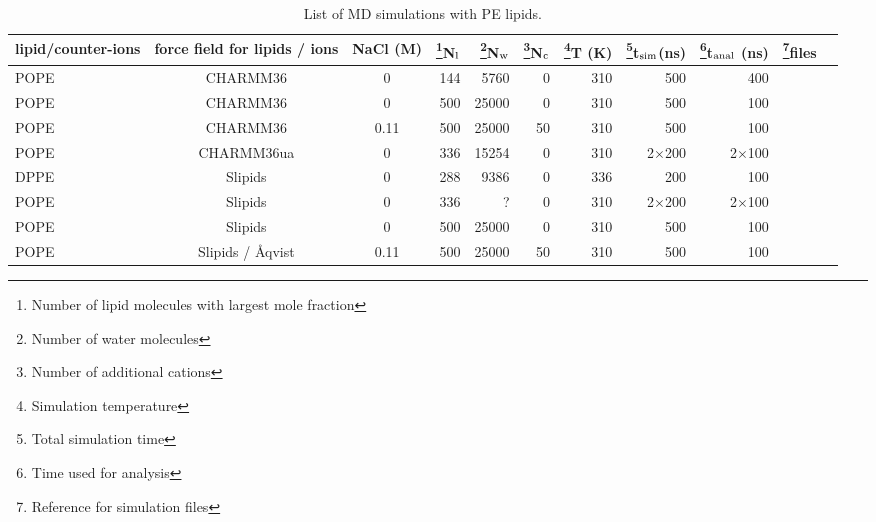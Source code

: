 \documentclass[aps,prl,superscriptaddress,twocolumn]{revtex4}
\begin{document}
\begin{table*}[htb]
  \centering
  \caption{List of MD simulations with PE lipids.
  }\label{systemsPE}
  \begin{minipage}[t]{\textwidth}
    \begin{tabular}{l c c r r r r r r c c}
      lipid/counter-ions & force field for lipids / ions  & NaCl (M) & \footnote{Number of lipid molecules with largest mole fraction}N$_{\rm l}$   &  \footnote{Number of water molecules}N$_{\rm w}$   & \footnote{Number of additional cations}N$_{\rm c}$   & \footnote{Simulation temperature}T (K)  & \footnote{Total simulation time}t$_{{\rm sim}}$(ns) & \footnote{Time used for analysis}t$_{{\rm anal}}$ (ns) &   \footnote{Reference for simulation files}files\\
      \hline
      POPE  & CHARMM36 \cite{??}           &0       & 144	& 5760  &0    & 310  & 500          & 400          & \cite{charmm36POPEfiles} \\
      POPE  & CHARMM36 \cite{??}           & 0      & 500       & 25000 & 0   &  310  & 500 & 100 & \cite{POPEcharmm} \\
      POPE  & CHARMM36 \cite{??}           & 0.11   & 500       & 25000 & 50  &  310  & 500 & 100 & \cite{POPEcharmm150mMNaCl} \\
      POPE  & CHARMM36ua \cite{??}         &0       & 336	& 15254 &0    & 310  & 2$\times$200 & 2$\times$100 & \cite{charmm36uaPOPEfiles}  \\
      \hline
      DPPE  & Slipids \cite{jambeck12b}    &0    & 288 	& 9386  &0    & 336  & 200 & 100 & \cite{slipidsDPPEfiles}  \\
      POPE  & Slipids \cite{jambeck12b} &0    & 336	& ?     &0    & 310  & 2$\times$200 &  2$\times$100 & \cite{slipidsPOPEfiles}  \\
      POPE  & Slipids \cite{jambeck12b}            & 0    & 500 & 25000 & 0   &  310  & 500 & 100 & \cite{POPEslipids} \\
      POPE  & Slipids / {\AA}qvist \cite{jambeck12b,aqvist90}  & 0.11 & 500 & 25000 & 50  &  310  & 500 & 100 & \cite{POPEslipids150mMNaCl} \\

\end{tabular}
\end{minipage}
\end{table*}
\end{document}
